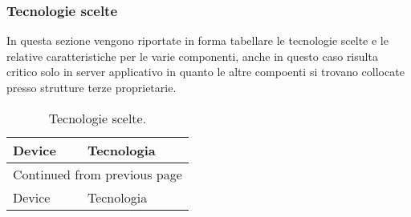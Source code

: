 \documentclass[onecolumn,a4paper]{article}
\begin{document}
\subsubsection{Tecnologie scelte}
\label{sec:org12719ff}
In questa sezione vengono riportate in forma tabellare le tecnologie scelte e le relative caratteristiche per le varie componenti, anche in questo caso risulta critico solo in server applicativo in quanto le altre compoenti si trovano collocate presso strutture terze proprietarie. 

\begin{longtable}{|l|p{10cm}|}
\caption{Tecnologie scelte.}
\\
\hline
Device & Tecnologia\\
\hline
\endfirsthead
\multicolumn{2}{l}{Continued from previous page} \\
\hline

Device & Tecnologia \\


\end{longtable}
\end{document}
